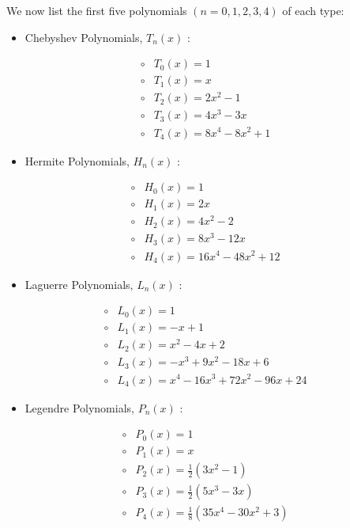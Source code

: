 \documentclass[10pt]{article}
\begin{document}
We now list the first five polynomials $(n=0,1,2,3,4)$ of each type:

\begin{itemize}
  \item Chebyshev Polynomials, $T_{n}(x)$ :
\end{itemize}

$$
\begin{array}{ll}
\circ & T_{0}(x)=1 \\
\circ & T_{1}(x)=x \\
\circ & T_{2}(x)=2 x^{2}-1 \\
\circ & T_{3}(x)=4 x^{3}-3 x \\
\circ & T_{4}(x)=8 x^{4}-8 x^{2}+1
\end{array}
$$

\begin{itemize}
  \item Hermite Polynomials, $H_{n}(x)$ :
\end{itemize}

$$
\begin{array}{ll}
\circ & H_{0}(x)=1 \\
\circ & H_{1}(x)=2 x \\
\circ & H_{2}(x)=4 x^{2}-2 \\
\circ & H_{3}(x)=8 x^{3}-12 x \\
\circ & H_{4}(x)=16 x^{4}-48 x^{2}+12
\end{array}
$$

\begin{itemize}
  \item Laguerre Polynomials, $L_{n}(x)$ :
\end{itemize}

$$
\begin{array}{ll}
\circ & L_{0}(x)=1 \\
\circ & L_{1}(x)=-x+1 \\
\circ & L_{2}(x)=x^{2}-4 x+2 \\
\circ & L_{3}(x)=-x^{3}+9 x^{2}-18 x+6 \\
\circ & L_{4}(x)=x^{4}-16 x^{3}+72 x^{2}-96 x+24
\end{array}
$$

\begin{itemize}
  \item Legendre Polynomials, $P_{n}(x)$ :
\end{itemize}

$$
\begin{array}{ll}
\circ & P_{0}(x)=1 \\
\circ & P_{1}(x)=x \\
\circ & P_{2}(x)=\frac{1}{2}\left(3 x^{2}-1\right) \\
\circ & P_{3}(x)=\frac{1}{2}\left(5 x^{3}-3 x\right) \\
\circ & P_{4}(x)=\frac{1}{8}\left(35 x^{4}-30 x^{2}+3\right)
\end{array}
$$
\end{document}
